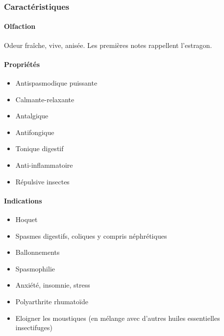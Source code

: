 \documentclass[12pt,a4wide]{article}
\begin{document}
\subsubsection{Caractéristiques}
\label{sec-4-3-1}

\paragraph{Olfaction}
\label{sec-4-3-1-1}
Odeur fraîche, vive, anisée. Les premières notes rappellent l'estragon.
\paragraph{Propriétés}
\label{sec-4-3-1-2}

\begin{itemize}
\item Antispasmodique puissante
\item Calmante-relaxante
\item Antalgique
\item Antifongique
\item Tonique digestif
\item Anti-inflammatoire
\item Répulsive insectes
\end{itemize}

\paragraph{Indications}
\label{sec-4-3-1-3}
\begin{itemize}
\item Hoquet
\item Spasmes digestifs, coliques y compris néphrétiques
\item Ballonnements
\item Spasmophilie
\item Anxiété, insomnie, stress
\item Polyarthrite rhumatoïde
\item Eloigner les moustiques (en mélange avec d'autres huiles essentielles insectifuges)
\end{itemize}
\end{document}
